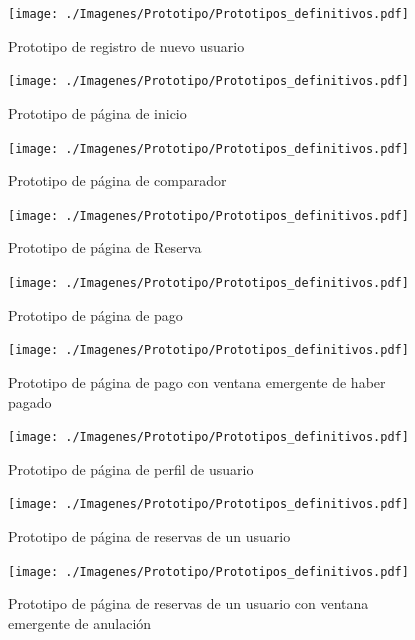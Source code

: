 \begin{figure}[H]
    \centering
    \texttt{[image: ./Imagenes/Prototipo/Prototipos\_definitivos.pdf]}
    \label{fig:prot_reg}
    \caption{Prototipo de registro de nuevo usuario}
\end{figure}

\begin{figure}[H]
    \centering
    \texttt{[image: ./Imagenes/Prototipo/Prototipos\_definitivos.pdf]}
    \label{fig:prot_inicio}
    \caption{Prototipo de página de inicio}
\end{figure}

\begin{figure}[H]
    \centering
    \texttt{[image: ./Imagenes/Prototipo/Prototipos\_definitivos.pdf]}
    \label{fig:prot_comp}
    \caption{Prototipo de página de comparador}
\end{figure}

\begin{figure}[H]
    \centering
    \texttt{[image: ./Imagenes/Prototipo/Prototipos\_definitivos.pdf]}
    \label{fig:prot_reser}
    \caption{Prototipo de página de Reserva}
\end{figure}

\begin{figure}[H]
    \centering
    \texttt{[image: ./Imagenes/Prototipo/Prototipos\_definitivos.pdf]}
    \label{fig:prot_pago}
    \caption{Prototipo de página de pago}
\end{figure}

\begin{figure}[H]
    \centering
    \texttt{[image: ./Imagenes/Prototipo/Prototipos\_definitivos.pdf]}
    \label{fig:prot_pago_popup}
    \caption{Prototipo de página de pago con ventana emergente de haber pagado}
\end{figure}

\begin{figure}[H]
    \centering
    \texttt{[image: ./Imagenes/Prototipo/Prototipos\_definitivos.pdf]}
    \label{fig:prot_perfil}
    \caption{Prototipo de página de perfil de usuario}
\end{figure}

\begin{figure}[H]
    \centering
    \texttt{[image: ./Imagenes/Prototipo/Prototipos\_definitivos.pdf]}
    \label{fig:prot_reservas_usuario}
    \caption{Prototipo de página de reservas de un usuario}
\end{figure}

\begin{figure}[H]
    \centering
    \texttt{[image: ./Imagenes/Prototipo/Prototipos\_definitivos.pdf]}
    \label{fig:prot_reservas_usuario_popup}
    \caption{Prototipo de página de reservas de un usuario con ventana emergente de anulación}
\end{figure}

